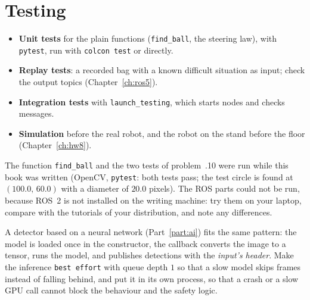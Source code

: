\section*{Testing}
\begin{itemize}[nosep]
\item \textbf{Unit tests} for the plain functions (\verb!find_ball!, the steering law), with \verb!pytest!, run with \verb!colcon test! or directly.
\item \textbf{Replay tests}: a recorded bag with a known difficult situation as input; check the output topics (Chapter~\ref{ch:ros5}).
\item \textbf{Integration tests} with \verb!launch_testing!, which starts nodes and checks messages.
\item \textbf{Simulation} before the real robot, and the robot on the stand before the floor (Chapter~\ref{ch:hw8}).
\end{itemize}
The function \verb!find_ball! and the two tests of problem~\thechapter.10 were run while this book was written (OpenCV, \verb!pytest!: both tests pass; the test circle is found at $(100.0,\,60.0)$ with a diameter of $20.0$ pixels). The ROS parts could not be run, because ROS~2 is not installed on the writing machine: try them on your laptop, compare with the tutorials of your distribution, and note any differences.

\begin{aibox}
A detector based on a neural network (Part~\ref{part:ai}) fits the same pattern: the model is loaded once in the constructor, the callback converts the image to a tensor, runs the model, and publishes detections with the \emph{input's header}. Make the inference \verb!best effort! with queue depth $1$ so that a slow model skips frames instead of falling behind, and put it in its own process, so that a crash or a slow GPU call cannot block the behaviour and the safety logic.
\end{aibox}

